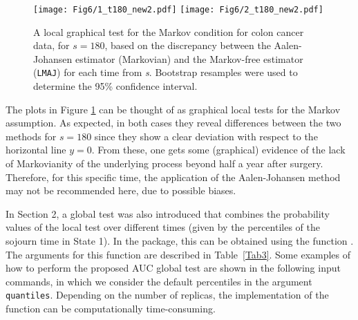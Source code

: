 \begin{figure} [t] %
\begin{center}
\texttt{[image: Fig6/1\_t180\_new2.pdf]}
\texttt{[image: Fig6/2\_t180\_new2.pdf]}\\

\caption{A local graphical test for the Markov condition for colon cancer data, for $s = 180$, based on the discrepancy between the Aalen-Johansen estimator (Markovian) and the Markov-free estimator (\texttt{LMAJ}) for each time from \textit{s}. Bootstrap resamples were used to determine the 95\% confidence interval.}
\label{fig6}
\end{center}
\end{figure}

The plots in Figure \ref{fig6} can be thought of as graphical local tests for the Markov assumption. As expected, in both cases they reveal differences between the two methods for $s=180$ since they show a clear deviation with respect to the horizontal line $y=0$. From these, one gets some (graphical) evidence of the lack of Markovianity of the underlying process beyond half a year after surgery. Therefore, for this specific time, the application of the Aalen-Johansen method may not be recommended here, due to possible biases. %

In Section 2, a global test was also introduced that combines the probability values of the local test over different times (given by the percentiles of the sojourn time in State 1). In the  package, this can be obtained using the function . The arguments for this function are described in Table~\ref{Tab3}. Some examples of how to perform the proposed AUC global test are shown in the following input commands, in which we consider the default percentiles in the argument \texttt{quantiles}. Depending on the number of replicas, the implementation of the  function can be computationally time-consuming.



